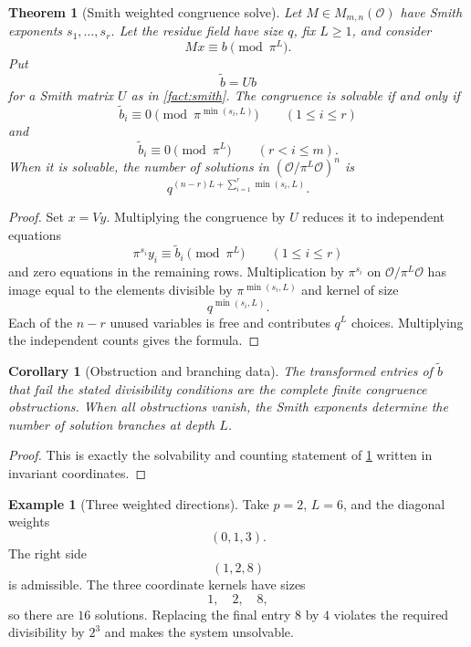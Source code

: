 \documentclass{aomart}
\newtheorem{theorem}{Theorem}[section]
\newtheorem{corollary}[corollary]{Corollary}
\theoremstyle{definition}
\newtheorem{example}[example]{Example}
\theoremstyle{remark}
\newcommand{\OO}{\mathcal O}
\begin{document}
\begin{theorem}[Smith weighted congruence solve]\label{thm:smith_congruence}
Let $M\in M_{m,n}(\OO)$ have Smith exponents $s_1,\ldots,s_r$.  Let the residue field have size $q$, fix $L\geq1$, and consider
\[
Mx\equiv b\pmod{\pi^L}.
\]
Put
\[
\widetilde b=Ub
\]
for a Smith matrix $U$ as in \cref{fact:smith}.  The congruence is solvable if and only if
\[
\widetilde b_i\equiv0
\pmod{\pi^{\min(s_i,L)}}
\qquad(1\leq i\leq r)
\]
and
\[
\widetilde b_i\equiv0
\pmod{\pi^L}
\qquad(r<i\leq m).
\]
When it is solvable, the number of solutions in $(\OO/\pi^L\OO)^n$ is
\[
\boxed{
q^{(n-r)L+\sum_{i=1}^r\min(s_i,L)}.
}
\]
\end{theorem}

\begin{proof}
Set $x=Vy$.  Multiplying the congruence by $U$ reduces it to independent equations
\[
\pi^{s_i}y_i\equiv\widetilde b_i\pmod{\pi^L}
\qquad(1\leq i\leq r)
\]
and zero equations in the remaining rows.  Multiplication by $\pi^{s_i}$ on $\OO/\pi^L\OO$ has image equal to the elements divisible by $\pi^{\min(s_i,L)}$ and kernel of size
\[
q^{\min(s_i,L)}.
\]
Each of the $n-r$ unused variables is free and contributes $q^L$ choices.  Multiplying the independent counts gives the formula.
\end{proof}

\begin{corollary}[Obstruction and branching data]\label{cor:smith_obstruction}
The transformed entries of $\widetilde b$ that fail the stated divisibility conditions are the complete finite congruence obstructions.  When all obstructions vanish, the Smith exponents determine the number of solution branches at depth $L$.
\end{corollary}

\begin{proof}
This is exactly the solvability and counting statement of \cref{thm:smith_congruence} written in invariant coordinates.
\end{proof}

\begin{example}[Three weighted directions]\label{ex:smith_three}
Take $p=2$, $L=6$, and the diagonal weights
\[
(0,1,3).
\]
The right side
\[
(1,2,8)
\]
is admissible.  The three coordinate kernels have sizes
\[
1,
\quad2,
\quad8,
\]
so there are $16$ solutions.  Replacing the final entry $8$ by $4$ violates the required divisibility by $2^3$ and makes the system unsolvable.
\end{example}
\end{document}

